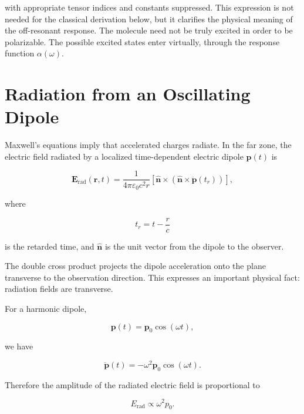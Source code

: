 \documentclass[11pt,a4paper]{article}
\begin{document}
with appropriate tensor indices and constants suppressed. This expression is
not needed for the classical derivation below, but it clarifies the physical
meaning of the off-resonant response. The molecule need not be truly excited
in order to be polarizable. The possible excited states enter virtually,
through the response function \(\alpha(\omega)\).

\section{Radiation from an Oscillating Dipole}

Maxwell's equations imply that accelerated charges radiate. In the far zone,
the electric field radiated by a localized time-dependent electric dipole
\(\mathbf{p}(t)\) is

\begin{equation}
\mathbf{E}_{\mathrm{rad}}(\mathbf{r},t)
=
\frac{1}{4\pi\varepsilon_0 c^2 r}
\left[
\hat{\mathbf{n}}
\times
\left(
\hat{\mathbf{n}}
\times
\ddot{\mathbf{p}}(t_r)
\right)
\right],
\end{equation}

where

\begin{equation}
t_r = t - \frac{r}{c}
\end{equation}

is the retarded time, and \(\hat{\mathbf{n}}\) is the unit vector from the
dipole to the observer.

The double cross product projects the dipole acceleration onto the plane
transverse to the observation direction. This expresses an important physical
fact: radiation fields are transverse.

For a harmonic dipole,

\begin{equation}
\mathbf{p}(t) = \mathbf{p}_0 \cos(\omega t),
\end{equation}

we have

\begin{equation}
\ddot{\mathbf{p}}(t) = -\omega^2 \mathbf{p}_0 \cos(\omega t).
\end{equation}

Therefore the amplitude of the radiated electric field is proportional to

\begin{equation}
E_{\mathrm{rad}} \propto \omega^2 p_0.
\end{equation}
\end{document}
